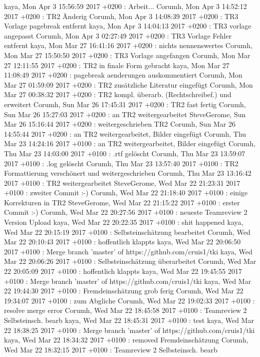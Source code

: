 kaya, Mon Apr 3 15:56:59 2017 +0200 : Arbeit...
Corumh, Mon Apr 3 14:52:12 2017 +0200 : TR2 Änderig
Corumh, Mon Apr 3 14:08:39 2017 +0200 : TR3 Vorlage pagebreak entfernt
kaya, Mon Apr 3 14:04:13 2017 +0200 : TR3 vorlage angepasst
Corumh, Mon Apr 3 02:27:49 2017 +0200 : TR3 Vorlage Fehler entfernt
kaya, Mon Mar 27 16:41:16 2017 +0200 : nichts nennenswertes
Corumh, Mon Mar 27 15:50:50 2017 +0200 : TR3 Vorlage angefangen
Corumh, Mon Mar 27 12:11:55 2017 +0200 : TR2 in finale Form gebracht
kaya, Mon Mar 27 11:08:49 2017 +0200 : pagebreak aenderungen auskommentiert
Corumh, Mon Mar 27 01:59:09 2017 +0200 : TR2 zusätzliche Literatur eingefügt
Corumh, Mon Mar 27 00:38:32 2017 +0200 : TR2 kompl. überarb. (Rechtschreibef.) und erweitert
Corumh, Sun Mar 26 17:45:31 2017 +0200 : TR2 fast fertig
Corumh, Sun Mar 26 15:27:03 2017 +0200 : an TR2 weitergearbeitet
SteveGerome, Sun Mar 26 15:16:44 2017 +0200 : weitergeschrieben TR2
Corumh, Sun Mar 26 14:55:44 2017 +0200 : an TR2 weitergearbeitet, Bilder eingefügt
Corumh, Thu Mar 23 14:24:16 2017 +0100 : an TR2 weitergearbeitet, Bilder eingefügt
Corumh, Thu Mar 23 14:03:00 2017 +0100 : .rtf gelöscht
Corumh, Thu Mar 23 13:59:07 2017 +0100 : .log gelöscht
Corumh, Thu Mar 23 13:57:40 2017 +0100 : TR2 Formattierung verschönert und weitergeschrieben
Corumh, Thu Mar 23 13:16:42 2017 +0100 : TR2 weitergearbeitet
SteveGerome, Wed Mar 22 21:23:31 2017 +0100 : zweiter Commit :-)
Corumh, Wed Mar 22 21:18:40 2017 +0100 : einige Korrekturen in TR2
SteveGerome, Wed Mar 22 21:15:22 2017 +0100 : erster Commit :-)
Corumh, Wed Mar 22 20:27:56 2017 +0100 : neueste Teamreview 2 Version Upload
kaya, Wed Mar 22 20:22:35 2017 +0100 : shit happened
kaya, Wed Mar 22 20:15:19 2017 +0100 : Selbsteinschätzung bearbeitet
Corumh, Wed Mar 22 20:10:43 2017 +0100 : hoffentlich klappts
kaya, Wed Mar 22 20:06:50 2017 +0100 : Merge branch 'master' of https://github.com/cruis1/tki
kaya, Wed Mar 22 20:06:26 2017 +0100 : Selbsteinschätzung überarbeitet
Corumh, Wed Mar 22 20:05:09 2017 +0100 : hoffentlich klappts
kaya, Wed Mar 22 19:45:55 2017 +0100 : Merge branch 'master' of https://github.com/cruis1/tki
kaya, Wed Mar 22 19:44:30 2017 +0100 : Fremdeinschätzung grob ferig
Corumh, Wed Mar 22 19:34:07 2017 +0100 : zum Abgliche
Corumh, Wed Mar 22 19:02:33 2017 +0100 : resolve merge error
Corumh, Wed Mar 22 18:45:58 2017 +0100 : Teamreview 2 Selbsteinsch. bearb
kaya, Wed Mar 22 18:45:31 2017 +0100 : test
kaya, Wed Mar 22 18:38:25 2017 +0100 : Merge branch 'master' of https://github.com/cruis1/tki
kaya, Wed Mar 22 18:34:32 2017 +0100 : removed Fremdeinschätzung
Corumh, Wed Mar 22 18:32:15 2017 +0100 : Teamreview 2 Selbsteinsch. bearb
